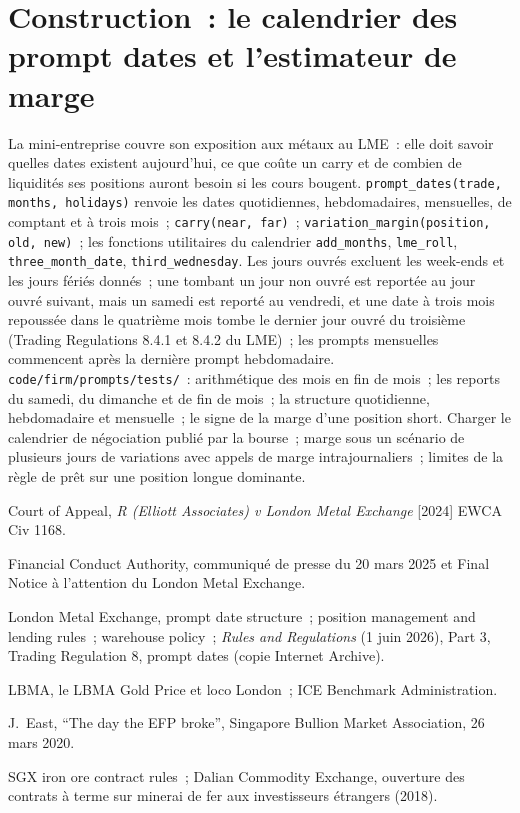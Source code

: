 \section{Construction~: le calendrier des prompt dates et l'estimateur de marge}\label{bld:m3:metals:prompts}

\begin{build}
 La mini-entreprise couvre son exposition aux métaux au LME~: elle doit savoir quelles dates existent aujourd'hui,
ce que coûte un carry et de combien de liquidités ses positions auront besoin si les cours bougent.
 \texttt{prompt\_dates(trade, months, holidays)} renvoie les dates quotidiennes, hebdomadaires, mensuelles,
de comptant et à trois mois~; \texttt{carry(near, far)}~; \texttt{variation\_margin(position, old,
new)}~; les fonctions utilitaires du calendrier \texttt{add\_months}, \texttt{lme\_roll},
\texttt{three\_month\_date}, \texttt{third\_wednesday}.
 Les jours ouvrés excluent les week-ends et les jours fériés donnés~; une  tombant un jour non ouvré
est reportée au jour ouvré suivant, mais un samedi est reporté au vendredi, et une date à trois mois repoussée dans le quatrième mois
tombe le dernier jour ouvré du troisième
(Trading Regulations 8.4.1 et 8.4.2 du LME)~; les prompts mensuelles commencent après la dernière prompt hebdomadaire.
 \texttt{code/firm/prompts/tests/}~: arithmétique des mois en fin de mois~; les reports du samedi,
du dimanche et de fin de mois~; la
structure quotidienne, hebdomadaire et mensuelle~; le signe de la marge d'une position short.
 Charger le calendrier de négociation publié par la bourse~; marge sous un scénario de
plusieurs jours de variations avec appels de marge intrajournaliers~; limites de la règle de prêt sur une position longue dominante.
\end{build}

\begin{omsources}
\item Court of Appeal, \emph{R (Elliott Associates) v London Metal Exchange} [2024] EWCA Civ 1168.
\item Financial Conduct Authority, communiqué de presse du 20 mars 2025 et Final Notice à l'attention du London
Metal Exchange.
\item London Metal Exchange, prompt date structure~; position management and lending rules~; warehouse
policy~; \emph{Rules and Regulations} (1 juin 2026), Part 3, Trading Regulation 8, prompt dates (copie Internet Archive).
\item LBMA, le LBMA Gold Price et loco London~; ICE Benchmark Administration.
\item J.~East, ``The day the EFP broke'', Singapore Bullion Market Association, 26 mars 2020.
\item SGX iron ore contract rules~; Dalian Commodity Exchange, ouverture des contrats à terme sur minerai de fer
aux investisseurs étrangers (2018).
\end{omsources}

